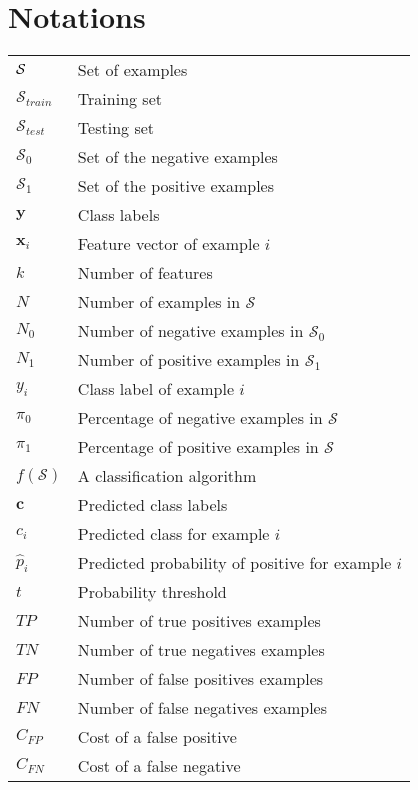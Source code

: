 
\chapter{Notations}

\begin{tabularx}{\textwidth}{ l X }
$\cal S$ 		& Set of examples \\ 
$\mathcal{S}_{train}$ 	& Training set\\
$\mathcal{S}_{test}$ 	& Testing set \\
$\mathcal{S}_0$  & Set of the negative examples \\
$\mathcal{S}_1$  & Set of the positive examples \\
$\mathbf{y}$ 		& Class labels  \\  
$\mathbf{x}_i$ 		& Feature vector of example $i$ \\
$k$ 			& Number of features  \\
$N $ 			& Number of examples in $\mathcal{S}$ 	 \\
$N_0 $      & Number of negative examples in $\mathcal{S}_0$    \\
$N_1 $      & Number of positive examples in $\mathcal{S}_1$    \\
$y_i$ 			& Class label of example $i$  \\
$\pi_0$ & Percentage of negative examples in $\mathcal{S}$ \\
$\pi_1$ & Percentage of positive examples in $\mathcal{S}$ \\
$f(\mathcal{S})$ 	& A classification algorithm 	 \\
$\mathbf{c}$ 		& Predicted class labels \\  
$c_i$ 			& Predicted class for example $i$   \\
$\hat p_i$		& Predicted probability of positive for example $i$  \\
$t$ & Probability threshold \\ %
$TP$          & Number of true positives examples \\
$TN$          & Number of true negatives examples \\
$FP$          & Number of false positives examples \\
$FN$          & Number of false negatives examples \\
$C_{FP}$    & Cost of a false positive   \\ 
$C_{FN}$    & Cost of a false negative    \\ 

\end{tabularx}
